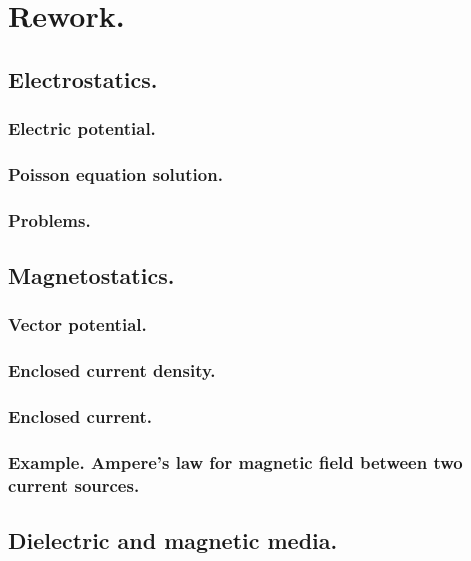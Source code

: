       \chapter{Rework.}
      \section{Electrostatics.}
         \subsection{Electric potential.}
            
         \subsection{Poisson equation solution.}
            
         \subsection{Problems.}
            
      \section{Magnetostatics.}
         \subsection{Vector potential.}
            
         \subsection{Enclosed current density.}
            
         \subsection{Enclosed current.}
            
         \subsection{Example.  Ampere's law for magnetic field between two current sources.}
            
      \section{Dielectric and magnetic media.}
         

